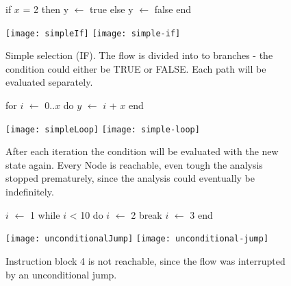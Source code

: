 \begin{figure}[!h]
	\begin{GenericCode}
		if $x$ = 2 then 
			y $\leftarrow$ true
		else
			y $\leftarrow$ false
		end
	\end{GenericCode}
	\centering
	\texttt{[image: simpleIf]}
	\texttt{[image: simple-if]}
	\caption{Simple selection (IF). The flow is divided into to branches - the condition could either be TRUE or FALSE. Each path will be evaluated separately. }
	\label{fig:simpleIf}	
\end{figure}

\begin{figure}[!h]
	\begin{GenericCode}
		for $i$ $\leftarrow$ 0..$x$ do
			$y$ $\leftarrow$ $i$ + $x$
		end		
	\end{GenericCode}
	\centering
	\texttt{[image: simpleLoop]}
	\texttt{[image: simple-loop]}
	\caption{After each iteration the condition will be evaluated with the new state again. Every Node is reachable, even tough the analysis stopped prematurely, since the analysis could eventually be indefinitely. }
	\label{fig:simpleLoop}
\end{figure}

\begin{figure}[!h]
	\begin{GenericCode}
		$i$ $\leftarrow$ 1
		while $i$ < 10 do
			$i$ $\leftarrow$ 2
			break
			$i$ $\leftarrow$ 3
		end
	\end{GenericCode}
	\centering
	\texttt{[image: unconditionalJump]}
	\texttt{[image: unconditional-jump]}
	\caption{Instruction block 4 is not reachable, since the flow was interrupted by an unconditional jump.}
	\label{fig:unconditionalJump}
\end{figure}

